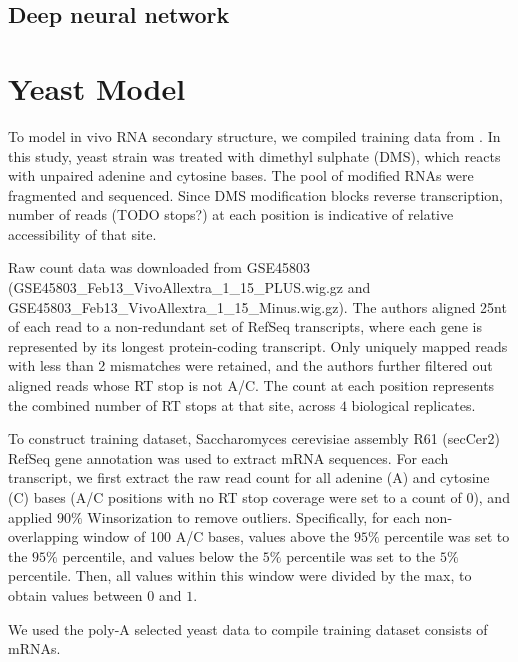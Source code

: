 \documentclass{proposal}
\begin{document}
\section{Deep neural network}

%
%

\chapter{Yeast Model}

To model in vivo RNA secondary structure, we compiled training data from \cite{rouskin2014genome}.
In this study, yeast strain was treated with ﻿dimethyl sulphate (DMS), which reacts with ﻿unpaired adenine and cytosine bases.
The pool of modified RNAs were fragmented and sequenced.
Since ﻿DMS modification blocks reverse transcription, ﻿
number of reads (TODO stops?) at each position is indicative of relative accessibility of that site.

Raw count data was downloaded from GSE45803 (GSE45803_Feb13_VivoAllextra_1_15_PLUS.wig.gz and GSE45803_Feb13_VivoAllextra_1_15_Minus.wig.gz).
The authors aligned 25nt of each read to a non-redundant set of RefSeq transcripts,
where each gene is represented by its longest protein-coding transcript.
Only uniquely mapped reads with less than 2 mismatches were retained,
and the authors further filtered out aligned reads whose RT stop is not A/C.
The count at each position represents the combined number of RT stops at that site, across $4$ biological replicates.

To construct training dataset, Saccharomyces cerevisiae assembly R61 (secCer2) RefSeq gene annotation was used to extract mRNA sequences.
For each transcript, we first extract the raw read count for all adenine (A) and cytosine (C) bases
(A/C positions with no RT stop coverage were set to a count of $0$),
and applied ﻿$90\%$ Winsorization to remove outliers.
Specifically, for each non-overlapping window of 100 A/C bases, values above the $95\%$ percentile was set to the $95\%$ percentile,
and values below the $5\%$ percentile was set to the $5\%$ percentile.
Then, all values within this window were divided by the max, to obtain values between $0$ and $1$.


We used the poly-A selected yeast data to compile training dataset consists of mRNAs.
\end{document}
